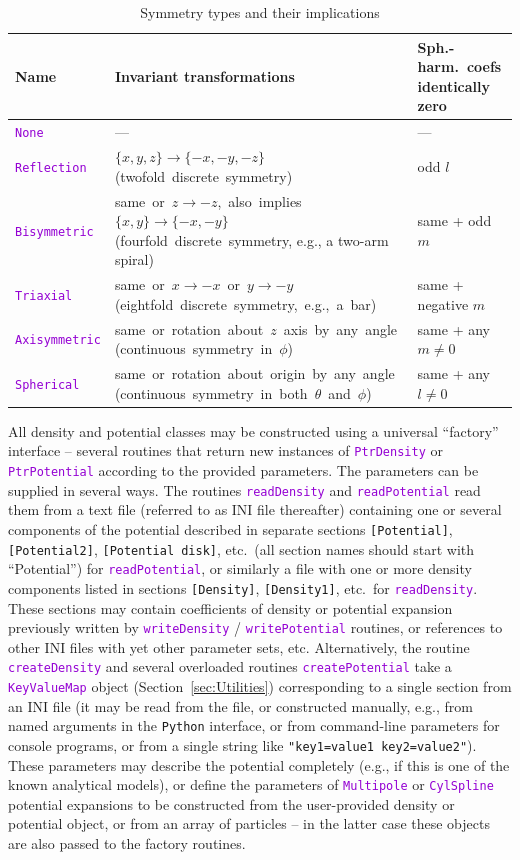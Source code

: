 \documentclass[12pt]{article}
\newcommand{\Python}{\texttt{Python}\xspace}
\newcommand{\ttt}[1]{\textcolor{darkviolet}{\texttt{#1}}}
\newcommand{\ppp}[1]{\textcolor{darkolive} {\texttt{#1}}}
\begin{document}
\begin{table}
\caption{Symmetry types and their implications}  \label{tab:Symmetry}
\renewcommand{\arraystretch}{1.25}
\begin{tabular}{l m{9.2cm} m{3.5cm}}
Name & Invariant transformations & \mbox{Sph.-harm.~coefs} identically zero \\
\hline
\ttt{None} & --- & --- \\[2mm]
\ttt{Reflection} & \mbox{$\{x,y,z\} \to \{-x,-y,-z\}$} \mbox{(twofold discrete symmetry)} & odd $l$ \\
\ttt{Bisymmetric} & \mbox{same or $z \to -z$, also implies $\{x,y\} \to \{-x,-y\}$} \mbox{(fourfold discrete symmetry}, e.g., a two-arm spiral) & same + odd $m$ \\
\ttt{Triaxial} & \mbox{same or $x \to -x$ or $y \to -y$} \mbox{(eightfold discrete symmetry, e.g., a bar)} & same + negative $m$ \\
\ttt{Axisymmetric} & \mbox{same or rotation about $z$ axis by any angle} \mbox{(continuous symmetry in $\phi$)} & same + any $m \ne 0$ \\
\ttt{Spherical} & \mbox{same or rotation about origin by any angle} \mbox{(continuous symmetry in both $\theta$ and $\phi$)} & same + any $l \ne 0$
\end{tabular}
\end{table}

All density and potential classes may be constructed using a universal ``factory'' interface -- several routines that return new instances of \ttt{PtrDensity} or \ttt{PtrPotential} according to the provided parameters.
The parameters can be supplied in several ways. The routines \ttt{readDensity} and \ttt{readPotential} read them from a text file (referred to as INI file thereafter) containing one or several components of the potential described in separate sections \ppp{[Potential]}, \ppp{[Potential2]}, \ppp{[Potential disk]}, etc.\ (all section names should start with ``Potential'') for \ttt{readPotential}, or similarly a file with one or more density components listed in sections \ppp{[Density]}, \ppp{[Density1]}, etc.\ for \ttt{readDensity}. These sections may contain coefficients of density or potential expansion previously written by \ttt{writeDensity} / \ttt{writePotential} routines, or references to other INI files with yet other parameter sets, etc.
Alternatively, the routine \ttt{createDensity} and several overloaded routines \ttt{createPotential} take a \ttt{KeyValueMap} object (Section~\ref{sec:Utilities}) corresponding to a single section from an INI file (it may be read  from the file, or constructed manually, e.g., from named arguments in the \Python interface, or from command-line parameters for console programs, or from a single string like \ppp{"key1=value1 key2=value2"}). These parameters may describe the potential completely (e.g., if this is one of the known analytical models), or define the parameters of \ttt{Multipole} or \ttt{CylSpline} potential expansions to be constructed from the user-provided density or potential object, or from an array of particles -- in the latter case these objects are also passed to the factory routines. 
\end{document}
